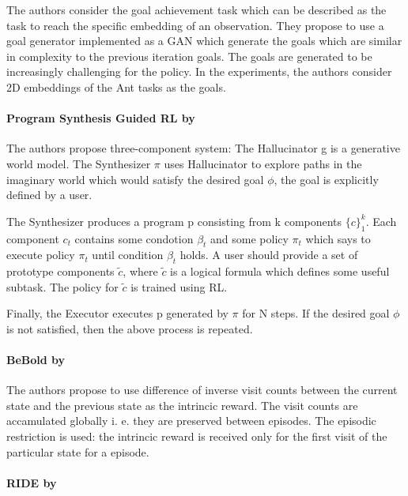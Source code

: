 \documentclass[acmsmall, nonacm]{acmart}
\begin{document}
The authors consider the goal achievement task which can be described as the task to reach the specific embedding of an observation. They propose to use a goal generator implemented as a GAN which generate the goals which are similar in complexity to the previous iteration goals. The goals are generated to be increasingly challenging for the policy. In the experiments, the authors consider 2D embeddings of the Ant tasks as the goals.


\paragraph{Program Synthesis Guided RL by \citet{Yang2021ProgramSG}}

The authors propose three-component system: The Hallucinator g is a generative world model. The Synthesizer $\pi$ uses Hallucinator to explore paths in the imaginary world which would satisfy the desired goal $\phi$, the goal is explicitly defined by a user.

The Synthesizer produces a program p consisting from k components $\{c\}_1^k$. Each component $c_t$ contains some condotion $\beta_t$ and some policy $\pi_t$ which says to execute policy $\pi_t$ until condition $\beta_t$ holds. A user should provide a set of prototype components $\tilde{c}$, where $\tilde{c}$ is a logical formula which defines some useful subtask. The policy for $\tilde{c}$ is trained using RL.

Finally, the Executor executes p generated by $\pi$ for N steps. If the desired goal $\phi$ is not satisfied, then the above process is repeated.


\paragraph{BeBold by \citet{Zhang2020BeBoldEB}}

The authors propose to use difference of inverse visit counts between the current state and the previous state as the intrincic reward. The visit counts are accamulated globally i. e. they are preserved between episodes. The episodic restriction is used: the intrincic reward is received only for the first visit of the particular state for a episode.


\paragraph{RIDE by \citet{Raileanu2020RIDERI}}
\end{document}
